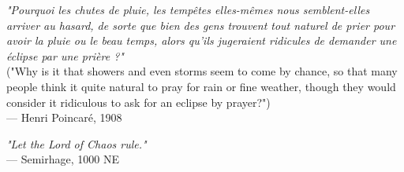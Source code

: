 \begin{flushright}
\emph{"Pourquoi les chutes de pluie, les tempêtes elles-mêmes nous semblent-elles arriver au hasard, de sorte que bien des gens trouvent tout naturel de prier pour avoir la pluie ou le beau temps, alors qu'ils jugeraient ridicules de demander une éclipse par une prière ?"} \\
("Why is it that showers and even storms seem to come by chance, so that many people think it quite natural to pray for rain or fine weather, though they would consider it ridiculous to ask for an eclipse by prayer?") \\
— Henri Poincaré, 1908
\end{flushright}
\vspace{2em}
\begin{flushright}
\emph{"Let the Lord of Chaos rule."}\\
 — Semirhage, 1000 NE
\end{flushright}